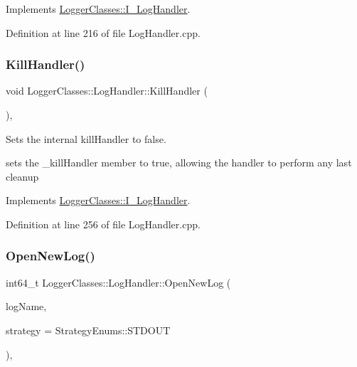 Implements \mbox{\hyperlink{classLoggerClasses_1_1I__LogHandler_a04149417f54199a40cc1b677df7940a3}{Logger\+Classes\+::\+I\+\_\+\+Log\+Handler}}.



Definition at line 216 of file Log\+Handler.\+cpp.

\mbox{\label{classLoggerClasses_1_1LogHandler_a5cff5ca829dc09d1d73e02e63eb65a0a}} 
\subsubsection{\texorpdfstring{KillHandler()}{KillHandler()}}
{\footnotesize\ttfamily void Logger\+Classes\+::\+Log\+Handler\+::\+Kill\+Handler (\begin{DoxyParamCaption}{ }\end{DoxyParamCaption})\hspace{0.3cm}{\ttfamily [override]}, {\ttfamily [virtual]}}



Sets the internal kill\+Handler to false. 

sets the \+\_\+kill\+Handler member to true, allowing the handler to perform any last cleanup 

Implements \mbox{\hyperlink{classLoggerClasses_1_1I__LogHandler_a7eba5b30d6f29d9cb8691832fd0b7c7a}{Logger\+Classes\+::\+I\+\_\+\+Log\+Handler}}.



Definition at line 256 of file Log\+Handler.\+cpp.

\mbox{\label{classLoggerClasses_1_1LogHandler_a78959a9c67210c64511bd18b7a3c8861}} 
\subsubsection{\texorpdfstring{OpenNewLog()}{OpenNewLog()}\hspace{0.1cm}{\footnotesize\ttfamily [1/2]}}
{\footnotesize\ttfamily int64\+\_\+t Logger\+Classes\+::\+Log\+Handler\+::\+Open\+New\+Log (\begin{DoxyParamCaption}\item[{const std\+::string \&}]{log\+Name,  }\item[{Strategy\+Enums}]{strategy = {\ttfamily StrategyEnums\+:\+:STDOUT} }\end{DoxyParamCaption})\hspace{0.3cm}{\ttfamily [override]}, {\ttfamily [virtual]}}



